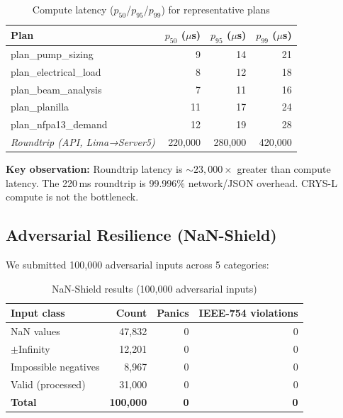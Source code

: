 \documentclass[11pt]{article}
\begin{document}
\begin{table}[h]
\centering
\caption{Compute latency ($p_{50}$/$p_{95}$/$p_{99}$) for representative plans}
\label{tab:latency}
\begin{tabular}{lrrr}
\toprule
\textbf{Plan} & \textbf{$p_{50}$ ($\mu$s)} & \textbf{$p_{95}$ ($\mu$s)} & \textbf{$p_{99}$ ($\mu$s)} \\
\midrule
plan\_pump\_sizing     & 9  & 14 & 21 \\
plan\_electrical\_load & 8  & 12 & 18 \\
plan\_beam\_analysis   & 7  & 11 & 16 \\
plan\_planilla         & 11 & 17 & 24 \\
plan\_nfpa13\_demand   & 12 & 19 & 28 \\
\midrule
\textit{Roundtrip (API, Lima→Server5)} & 220,000 & 280,000 & 420,000 \\
\bottomrule
\end{tabular}
\end{table}

\textbf{Key observation:} Roundtrip latency is $\sim\!23{,}000\times$ greater than compute
latency. The 220\,ms roundtrip is 99.996\% network/JSON overhead.
CRYS-L compute is not the bottleneck.

\subsection{Adversarial Resilience (NaN-Shield)}

We submitted 100,000 adversarial inputs across 5 categories:

\begin{table}[h]
\centering
\caption{NaN-Shield results (100,000 adversarial inputs)}
\label{tab:nanshield}
\begin{tabular}{lrrr}
\toprule
\textbf{Input class} & \textbf{Count} & \textbf{Panics} & \textbf{IEEE-754 violations} \\
\midrule
NaN values               & 47,832 & 0 & 0 \\
$\pm$Infinity            & 12,201 & 0 & 0 \\
Impossible negatives     & 8,967  & 0 & 0 \\
Valid (processed)        & 31,000 & 0 & 0 \\
\midrule
\textbf{Total}           & \textbf{100,000} & \textbf{0} & \textbf{0} \\
\bottomrule
\end{tabular}
\end{table}
\end{document}
